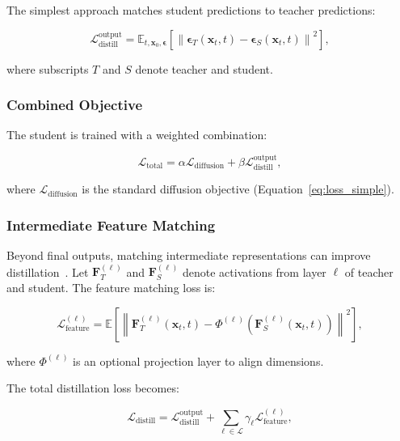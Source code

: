 \documentclass[12pt]{report}
\theoremstyle{definition}
\newcommand{\E}{\mathbb{E}}
\newcommand{\loss}{\mathcal{L}}
\newcommand{\norm}[1]{\left\| #1 \right\|}
\begin{document}
The simplest approach matches student predictions to teacher predictions:

\begin{equation}
\loss_{\text{distill}}^{\text{output}} = \E_{t, \mathbf{x}_0, \boldsymbol{\epsilon}}\left[\norm{\boldsymbol{\epsilon}_T(\mathbf{x}_t, t) - \boldsymbol{\epsilon}_S(\mathbf{x}_t, t)}^2\right],
\label{eq:output_distill}
\end{equation}

where subscripts $T$ and $S$ denote teacher and student.

\subsubsection{Combined Objective}

The student is trained with a weighted combination:

\begin{equation}
\loss_{\text{total}} = \alpha \loss_{\text{diffusion}} + \beta \loss_{\text{distill}}^{\text{output}},
\label{eq:combined_distill_loss}
\end{equation}

where $\loss_{\text{diffusion}}$ is the standard diffusion objective (Equation~\eqref{eq:loss_simple}).

\subsubsection{Intermediate Feature Matching}

Beyond final outputs, matching intermediate representations can improve distillation~\citep{romero2014fitnets}. Let $\mathbf{F}_T^{(\ell)}$ and $\mathbf{F}_S^{(\ell)}$ denote activations from layer $\ell$ of teacher and student. The feature matching loss is:

\begin{equation}
\loss_{\text{feature}}^{(\ell)} = \E\left[\norm{\mathbf{F}_T^{(\ell)}(\mathbf{x}_t, t) - \Phi^{(\ell)}(\mathbf{F}_S^{(\ell)}(\mathbf{x}_t, t))}^2\right],
\label{eq:feature_matching}
\end{equation}

where $\Phi^{(\ell)}$ is an optional projection layer to align dimensions.

The total distillation loss becomes:

\begin{equation}
\loss_{\text{distill}} = \loss_{\text{distill}}^{\text{output}} + \sum_{\ell \in \mathcal{L}} \gamma_\ell \loss_{\text{feature}}^{(\ell)},
\label{eq:total_distill_feature}
\end{equation}
\end{document}
